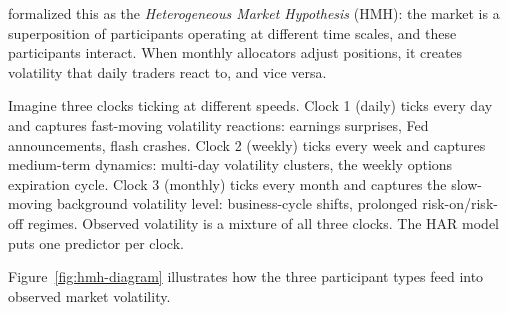 \citet{Muller1993} formalized this as the \emph{Heterogeneous Market Hypothesis} (HMH): the market is a superposition of participants operating at different time scales, and these participants interact.
When monthly allocators adjust positions, it creates volatility that daily traders react to, and vice versa.

\begin{intuition}
Imagine three clocks ticking at different speeds.
Clock 1 (daily) ticks every day and captures fast-moving volatility reactions: earnings surprises, Fed announcements, flash crashes.
Clock 2 (weekly) ticks every week and captures medium-term dynamics: multi-day volatility clusters, the weekly options expiration cycle.
Clock 3 (monthly) ticks every month and captures the slow-moving background volatility level: business-cycle shifts, prolonged risk-on/risk-off regimes.
Observed volatility is a mixture of all three clocks.
The HAR model puts one predictor per clock.
\end{intuition}

Figure~\ref{fig:hmh-diagram} illustrates how the three participant types feed into observed market volatility.

